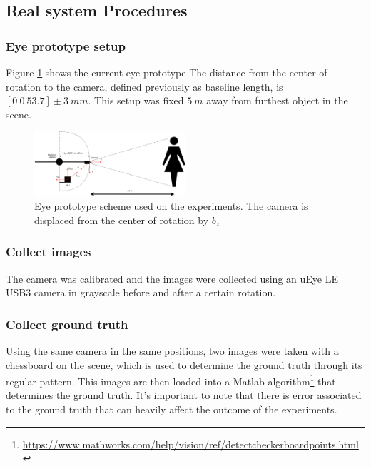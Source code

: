\subsection{Real system Procedures} 

\subsubsection{Eye prototype setup}
Figure \ref{cha4:sec3:eyescheme} shows the current eye prototype  The distance from the center of rotation to the camera, defined previously as baseline length, is $[0 \ 0 \ 53.7] \pm 3 \ mm $. This setup was fixed $5 \ m$ away from furthest object in the scene.
\begin{figure}[ht]
	\centering
	\includegraphics[width=0.5\textwidth]{images/eyescheme.pdf}
	\caption[Eye prototype scheme used on the experiments]{Eye prototype scheme used on the experiments. The camera is displaced from the center of rotation by $b_z$ }
	\label{cha4:sec3:eyescheme}
\end{figure}

\subsubsection{Collect images}
The camera was calibrated and the images were collected using an uEye LE USB3 camera in grayscale before and after a certain rotation.

\subsubsection{Collect ground truth}
Using the same camera in the same positions, two images were taken with a chessboard on the scene, which is used to determine the ground truth through its regular pattern. This images are then loaded into a Matlab algorithm\footnote{\href{https://www.mathworks.com/help/vision/ref/detectcheckerboardpoints.html}{https://www.mathworks.com/help/vision/ref/detectcheckerboardpoints.html}} that determines the ground truth. It's important to note that there is error associated to the ground truth that can heavily affect the outcome of the experiments.	 

